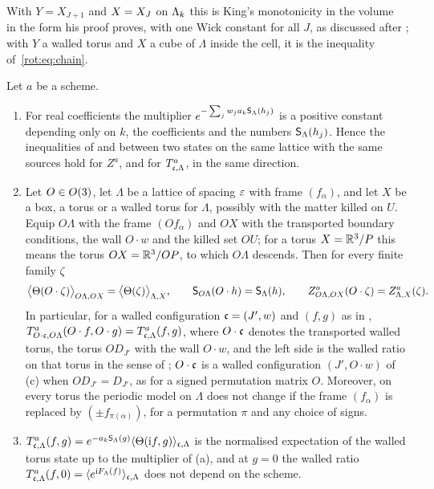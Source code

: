 With $Y=X_{J+1}$ and $X=X_J$ on $\Lambda_k$ this is King's monotonicity in the volume~\cite[Thm.~3.2, (3.31)--(3.33)]{K2} in the form his proof proves, with one Wick constant for all $J$, as discussed after ; with $Y$ a walled torus and $X$ a cube of $\Lambda$ inside the cell, it is the inequality of~\eqref{rot:eq:chain}.

\begin{lemma}\label{rot:lem:walledalg}
Let $a$ be a scheme.
\begin{enumerate}[label=\textup{(\alph*)},leftmargin=*]
\item For real coefficients the multiplier $e^{-\sum_jw_ja_k\mathsf S_\Lambda(h_j)}$ is a positive constant depending only on $k$, the coefficients and the numbers $\mathsf S_\Lambda(h_j)$. Hence the inequalities of  and  between two states on the same lattice with the same sources hold for $Z^a$, and for $T^{a}_{\mathfrak c,\Lambda}$, in the same direction.
\item Let $O\in O(3)$, let $\Lambda$ be a lattice of spacing $\varepsilon$ with frame $(f_\alpha)$, and let $X$ be a box, a torus or a walled torus for $\Lambda$, possibly with the matter killed on $U$. Equip $O\Lambda$ with the frame $(Of_\alpha)$ and $OX$ with the transported boundary conditions, the wall $O\cdot w$ and the killed set $OU$; for a torus $X=\mathbb R^3/P$ this means the torus $OX=\mathbb R^3/OP$, to which $O\Lambda$ descends. Then for every finite family $\zeta$
\[
\big\langle\Theta(O\cdot\zeta)\big\rangle_{O\Lambda,OX}=\big\langle\Theta(\zeta)\big\rangle_{\Lambda,X},\qquad
\mathsf S_{O\Lambda}(O\cdot h)=\mathsf S_\Lambda(h),\qquad
Z^a_{O\Lambda,OX}(O\cdot\zeta)=Z^a_{\Lambda,X}(\zeta).
\]
In particular, for a walled configuration $\mathfrak c=(J',w)$ and $(f,g)$ as in , $T^{a}_{O\cdot\mathfrak c,O\Lambda}(O\cdot f,O\cdot g)=T^{a}_{\mathfrak c,\Lambda}(f,g)$, where $O\cdot\mathfrak c$ denotes the transported walled torus, the torus $OD_{J'}$ with the wall $O\cdot w$, and the left side is the walled ratio on that torus in the sense of ; $O\cdot\mathfrak c$ is a walled configuration $(J',O\cdot w)$ of (c) when $OD_{J'}=D_{J'}$, as for a signed permutation matrix $O$. Moreover, on every torus the periodic model on $\Lambda$ does not change if the frame $(f_\alpha)$ is replaced by $(\pm f_{\pi(\alpha)})$, for a permutation $\pi$ and any choice of signs.
\item $T^{a}_{\mathfrak c,\Lambda}(f,g)=e^{-a_k\mathsf S_\Lambda(g)}\langle\Theta(\mathrm if,g)\rangle_{\mathfrak c,\Lambda}$ is the normalised expectation of the walled torus state up to the multiplier of \textup{(a)}, and at $g=0$ the walled ratio $T^{a}_{\mathfrak c,\Lambda}(f,0)=\langle e^{\mathrm iF_\Lambda(f)}\rangle_{\mathfrak c,\Lambda}$ does not depend on the scheme.
\end{enumerate}
\end{lemma}

